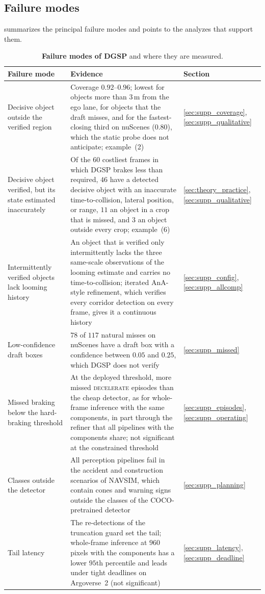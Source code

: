 \documentclass[10pt,letterpaper]{article}
\renewcommand{\arraystretch}{1.08}
\newcommand{\method}{DGSP\xspace}
\theoremstyle{remark}
\theoremstyle{plain}
\theoremstyle{definition}
\begin{document}
\subsection{Failure modes}
\label{sec:supp_failures}

 summarizes the principal failure modes and points to the analyzes that support them.

\begin{table}[!htbp]
\centering
\caption{\textbf{Failure modes of \method} and where they are measured.}
\label{tab:failures}
\small
\renewcommand{\arraystretch}{1.15}
\begin{tabular}{@{}p{4.3cm}p{9.4cm}p{1.6cm}@{}}
\toprule
Failure mode & Evidence & Section \\
\midrule
Decisive object outside the verified region & Coverage $0.92$--$0.96$; lowest for objects more than $3$\,m from the ego lane, for objects that the draft misses, and for the fastest-closing third on nuScenes ($0.80$), which the static probe does not anticipate; example~(2) & \ref{sec:supp_coverage}, \ref{sec:supp_qualitative} \\
Decisive object verified, but its state estimated inaccurately & Of the $60$ costliest frames in which \method brakes less than required, $46$ have a detected decisive object with an inaccurate time-to-collision, lateral position, or range, $11$ an object in a crop that is missed, and $3$ an object outside every crop; example~(6) & \ref{sec:theory_practice}, \ref{sec:supp_qualitative} \\
Intermittently verified objects lack looming history & An object that is verified only intermittently lacks the three same-scale observations of the looming estimate and carries no time-to-collision; iterated AnA-style refinement, which verifies every corridor detection on every frame, gives it a continuous history & \ref{sec:supp_config}, \ref{sec:supp_allcomp} \\
Low-confidence draft boxes & $78$ of $117$ natural misses on nuScenes have a draft box with a confidence between $0.05$ and $0.25$, which \method does not verify & \ref{sec:supp_missed} \\
Missed braking below the hard-braking threshold & At the deployed threshold, more missed \textsc{decelerate} episodes than the cheap detector, as for whole-frame inference with the same components, in part through the refiner that all pipelines with the components share; not significant at the constrained threshold & \ref{sec:supp_episodes}, \ref{sec:supp_operating} \\
Classes outside the detector & All perception pipelines fail in the accident and construction scenarios of NAVSIM, which contain cones and warning signs outside the classes of the COCO-pretrained detector & \ref{sec:supp_planning} \\
Tail latency & The re-detections of the truncation guard set the tail; whole-frame inference at $960$ pixels with the components has a lower $95$th percentile and leads under tight deadlines on Argoverse~2 (not significant) & \ref{sec:supp_latency}, \ref{sec:supp_deadline} \\
\bottomrule
\end{tabular}
\end{table}
\end{document}
